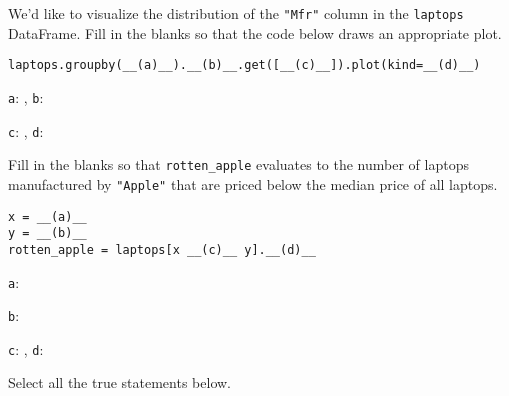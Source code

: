 \documentclass[twoside,12pt]{article}
\begin{document}
\begin{probset}

\begin{prob}

We'd like to visualize the distribution of the \texttt{"Mfr"} column in the \texttt{laptops} DataFrame. Fill in the blanks so that the code below draws an appropriate plot.

\begin{verbatim}
laptops.groupby(__(a)__).__(b)__.get([__(c)__]).plot(kind=__(d)__)
\end{verbatim}

\texttt{a}: , \texttt{b}: 

\texttt{c}: , \texttt{d}: 

\end{prob}

\begin{prob}
Fill in the blanks so that \texttt{rotten\_apple} evaluates to the number of laptops manufactured by \texttt{"Apple"} that are priced below the median price of all laptops.

\begin{verbatim}
x = __(a)__
y = __(b)__
rotten_apple = laptops[x __(c)__ y].__(d)__
\end{verbatim}

\texttt{a}: 

\texttt{b}: 

\texttt{c}: \inlineresponsebox[3in]{\texttt{\&}}{}, \texttt{d}: 
\end{prob}

\newpage

\begin{prob}

Select all the true statements below.




\end{prob}
\end{probset}
\end{document}
